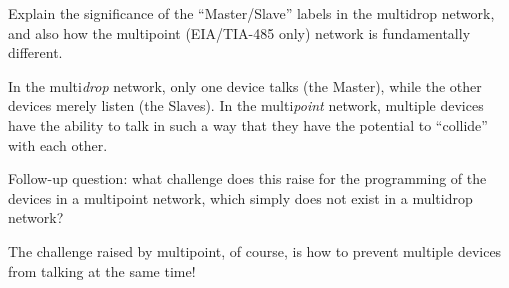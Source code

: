 Explain the significance of the ``Master/Slave'' labels in the multidrop network, and also how the multipoint (EIA/TIA-485 only) network is fundamentally different.







In the multi{\it drop} network, only one device talks (the Master), while the other devices merely listen (the Slaves).  In the multi{\it point} network, multiple devices have the ability to talk in such a way that they have the potential to ``collide'' with each other.

\vskip 10pt

Follow-up question: what challenge does this raise for the programming of the devices in a multipoint network, which simply does not exist in a multidrop network?







The challenge raised by multipoint, of course, is how to prevent multiple devices from talking at the same time!




